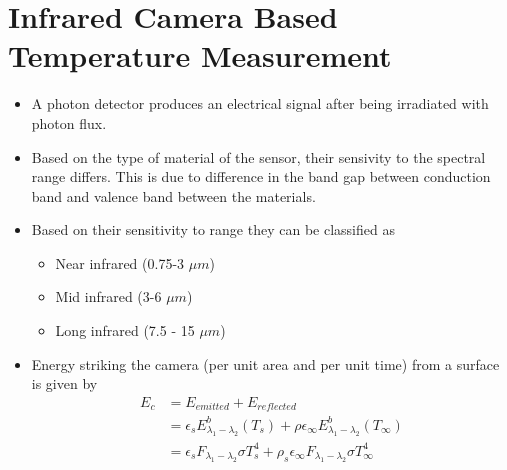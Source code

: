 \documentclass{article}
\begin{document}
\section{Infrared Camera Based Temperature Measurement}
	\begin{itemize}
		\item A photon detector produces an electrical signal after being irradiated with photon flux. 
		\item Based on the type of material of the sensor, their sensivity to the spectral range differs. This is due to difference in the band gap between conduction band and valence band between the materials.
		\item Based on their sensitivity to range they can be classified as 
		\begin{itemize}
			\item Near infrared (0.75-3 $\mu m$)
			\item Mid infrared (3-6 $\mu m$)
			\item Long infrared (7.5 - 15 $\mu m$)
		\end{itemize}
		\item Energy striking the camera (per unit area and per unit time) from a surface is given by 
		\begin{align*}
			E_c &= E_{emitted} + E_{reflected}\\
				&= \epsilon_s E^b_{\lambda_1-\lambda_2}(T_s) + \rho \epsilon_{\infty} E^b_{\lambda_1-\lambda_2}(T_\infty)\\
				&= \epsilon_s F_{\lambda_1-\lambda_2} \sigma T_s^4 + \rho_s \epsilon_{\infty} F_{\lambda_1-\lambda_2} \sigma T_\infty^4
		\end{align*}
	\end{itemize}	
\end{document}
